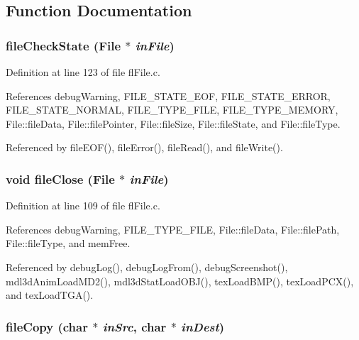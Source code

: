 \subsection{Function Documentation}
\subsubsection{ file\-Check\-State ({\bf File} $\ast$ {\em in\-File})}\label{flFile_8c_e4d685a401ce21554ebda7d01d4469e6}




Definition at line 123 of file fl\-File.c.

References debug\-Warning, FILE\_\-STATE\_\-EOF, FILE\_\-STATE\_\-ERROR, FILE\_\-STATE\_\-NORMAL, FILE\_\-TYPE\_\-FILE, FILE\_\-TYPE\_\-MEMORY, File::file\-Data, File::file\-Pointer, File::file\-Size, File::file\-State, and File::file\-Type.

Referenced by file\-EOF(), file\-Error(), file\-Read(), and file\-Write().
\subsubsection{\setlength{\rightskip}{0pt plus 5cm}void file\-Close ({\bf File} $\ast$ {\em in\-File})}\label{flFile_8c_bdd17f626a43391a546883c7a0544dc3}




Definition at line 109 of file fl\-File.c.

References debug\-Warning, FILE\_\-TYPE\_\-FILE, File::file\-Data, File::file\-Path, File::file\-Type, and mem\-Free.

Referenced by debug\-Log(), debug\-Log\-From(), debug\-Screenshot(), mdl3d\-Anim\-Load\-MD2(), mdl3d\-Stat\-Load\-OBJ(), tex\-Load\-BMP(), tex\-Load\-PCX(), and tex\-Load\-TGA().
\subsubsection{ file\-Copy (char $\ast$ {\em in\-Src}, char $\ast$ {\em in\-Dest})}\label{flFile_8c_05c6b10c65b33fe1e721042c9770105c}




